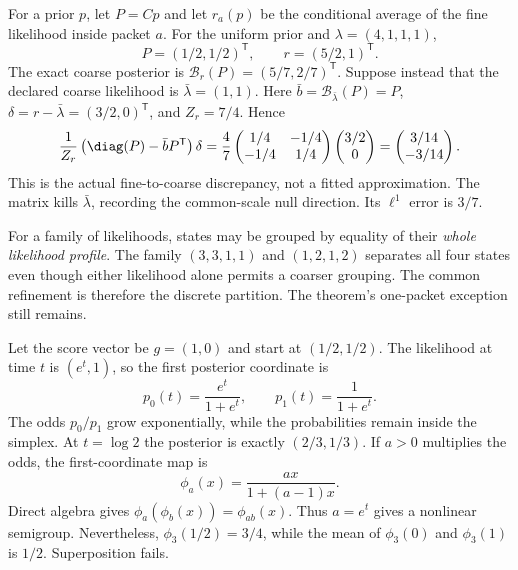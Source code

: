 For a prior $p$, let $P=Cp$ and let $r_a(p)$ be the conditional average of the fine likelihood inside packet $a$. For the uniform prior and $\lambda=(4,1,1,1)$,
\[
P=(1/2,1/2)^{\mathsf T},\qquad r=(5/2,1)^{\mathsf T}.
\]
The exact coarse posterior is $\mathcal B_r(P)=(5/7,2/7)^{\mathsf T}$. Suppose instead that the declared coarse likelihood is $\bar\lambda=(1,1)$.
Here $\bar b=\mathcal B_{\bar\lambda}(P)=P$, $\delta=r-\bar\lambda=(3/2,0)^{\mathsf T}$, and $Z_r=7/4$. Hence
\[
\frac1{Z_r}\left(\diag(P)-\bar bP^{\mathsf T}\right)\delta
=\frac4{7}\begin{pmatrix}1/4&-1/4\\-1/4&1/4\end{pmatrix}
\begin{pmatrix}3/2\\0\end{pmatrix}
=\begin{pmatrix}3/14\\-3/14\end{pmatrix}.
\]
This is the actual fine-to-coarse discrepancy, not a fitted approximation. The matrix kills $\bar\lambda$, recording the common-scale null direction. Its $\ell^1$ error is $3/7$.

For a family of likelihoods, states may be grouped by equality of their \emph{whole likelihood profile}. The family $(3,3,1,1)$ and $(1,2,1,2)$ separates all four states even though either likelihood alone permits a coarser grouping. The common refinement is therefore the discrete partition. The theorem's one-packet exception still remains.

Let the score vector be $g=(1,0)$ and start at $(1/2,1/2)$. The likelihood at time $t$ is $(e^t,1)$, so the first posterior coordinate is
\[
p_0(t)=\frac{e^t}{1+e^t},\qquad p_1(t)=\frac1{1+e^t}.
\]
The odds $p_0/p_1$ grow exponentially, while the probabilities remain inside the simplex. At $t=\log 2$ the posterior is exactly $(2/3,1/3)$.
If $a>0$ multiplies the odds, the first-coordinate map is
\[
\phi_a(x)=\frac{ax}{1+(a-1)x}.
\]
Direct algebra gives $\phi_a(\phi_b(x))=\phi_{ab}(x)$. Thus $a=e^t$ gives a nonlinear semigroup. Nevertheless, $\phi_3(1/2)=3/4$, while the mean of $\phi_3(0)$ and $\phi_3(1)$ is $1/2$. Superposition fails.

